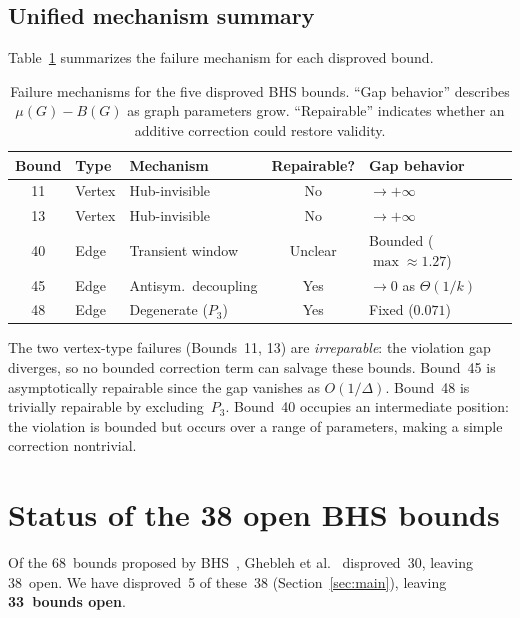 \documentclass[preprint,12pt]{elsarticle}
\theoremstyle{definition}
\theoremstyle{remark}
\newcommand{\Lspec}{\mu}               %
\begin{document}
\subsection{Unified mechanism summary}\label{ssec:unified}

Table~\ref{tab:mechanism-summary} summarizes the failure mechanism
for each disproved bound.

\begin{table}[t]
  \centering
  \caption{Failure mechanisms for the five disproved BHS bounds.
    ``Gap behavior'' describes $\Lspec(G) - B(G)$ as graph parameters
    grow.  ``Repairable'' indicates whether an additive correction could
    restore validity.}
  \label{tab:mechanism-summary}
  {\small
  \begin{tabular}{@{}cllcl@{}}
    \toprule
    Bound & Type & Mechanism & Repairable? & Gap behavior \\
    \midrule
    11 & Vertex & Hub-invisible & No & $\to +\infty$ \\
    13 & Vertex & Hub-invisible & No & $\to +\infty$ \\
    40 & Edge & Transient window & Unclear & Bounded ($\max \approx 1.27$) \\
    45 & Edge & Antisym.\ decoupling & Yes & $\to 0$ as $\Theta(1/k)$ \\
    48 & Edge & Degenerate ($P_3$) & Yes & Fixed ($0.071$) \\
    \bottomrule
  \end{tabular}
  }
\end{table}

The two vertex-type failures (Bounds~11, 13) are \emph{irreparable}: the
violation gap diverges, so no bounded correction term can salvage these bounds.
Bound~45 is asymptotically repairable since the gap vanishes as
$O(1/\Delta)$.  Bound~48 is trivially repairable by excluding~$P_3$.
Bound~40 occupies an intermediate position: the violation is bounded but
occurs over a range of parameters, making a simple correction nontrivial.


\section{Status of the 38 open BHS bounds}\label{sec:classification}

Of the 68~bounds proposed by BHS~\cite{BHS2006}, Ghebleh et
al.~\cite{Ghebleh2024} disproved~30, leaving 38~open.
We have disproved~5 of these~38 (Section~\ref{sec:main}),
leaving \textbf{33~bounds open}.
\end{document}
